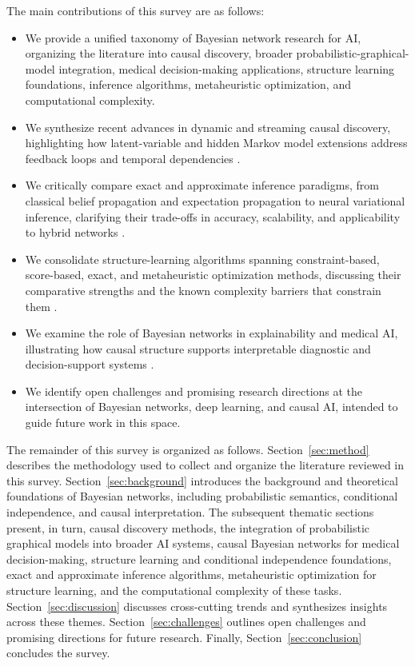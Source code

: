 The main contributions of this survey are as follows:

\begin{itemize}
\item We provide a unified taxonomy of Bayesian network research for AI, organizing the literature into causal discovery, broader probabilistic-graphical-model integration, medical decision-making applications, structure learning foundations, inference algorithms, metaheuristic optimization, and computational complexity.
\item We synthesize recent advances in dynamic and streaming causal discovery, highlighting how latent-variable and hidden Markov model extensions address feedback loops and temporal dependencies \cite{zhang2026causal,zhang2026causale,zhang2026dynamicb}.
\item We critically compare exact and approximate inference paradigms, from classical belief propagation and expectation propagation to neural variational inference, clarifying their trade-offs in accuracy, scalability, and applicability to hybrid networks \cite{murphy2013loopy,minka2013expectation,mnih2014neural,salmeron2018review}.
\item We consolidate structure-learning algorithms spanning constraint-based, score-based, exact, and metaheuristic optimization methods, discussing their comparative strengths and the known complexity barriers that constrain them \cite{kitson2023survey,singh2018finding,dagum1993approximating,sun2022bayesian}.
\item We examine the role of Bayesian networks in explainability and medical AI, illustrating how causal structure supports interpretable diagnostic and decision-support systems \cite{zhang2026explainable,selvaraj2024artificial,butz2022investigating}.
\item We identify open challenges and promising research directions at the intersection of Bayesian networks, deep learning, and causal AI, intended to guide future work in this space.
\end{itemize}

The remainder of this survey is organized as follows. Section~\ref{sec:method} describes the methodology used to collect and organize the literature reviewed in this survey. Section~\ref{sec:background} introduces the background and theoretical foundations of Bayesian networks, including probabilistic semantics, conditional independence, and causal interpretation. The subsequent thematic sections present, in turn, causal discovery methods, the integration of probabilistic graphical models into broader AI systems, causal Bayesian networks for medical decision-making, structure learning and conditional independence foundations, exact and approximate inference algorithms, metaheuristic optimization for structure learning, and the computational complexity of these tasks. Section~\ref{sec:discussion} discusses cross-cutting trends and synthesizes insights across these themes. Section~\ref{sec:challenges} outlines open challenges and promising directions for future research. Finally, Section~\ref{sec:conclusion} concludes the survey.

